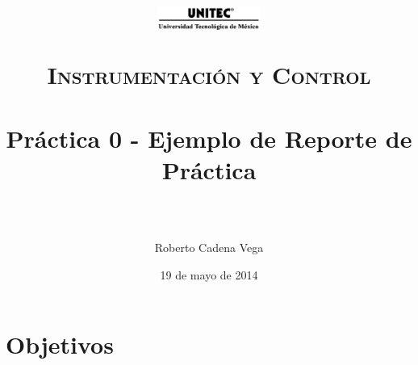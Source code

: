 



\title{	
	\normalfont \normalsize
	\begin{figure}[h]
		\begin{center}
			\includegraphics[width=0.3\textwidth]{../images/UNITEC.png}
		\end{center}
	\end{figure}
	\textsc{Instrumentación y Control} \\ [25pt]
	\horrule{0.5pt} \\[0.4cm] %
	\huge Práctica 0 - Ejemplo de Reporte de Práctica \\ %
	\horrule{2pt} \\[0.5cm] %
}

\author{Roberto Cadena Vega} %

\date{\normalsize 19 de mayo de 2014} %




\maketitle %


\section{Objetivos}

